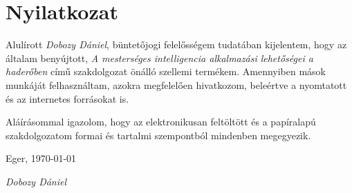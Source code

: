 \documentclass{thesis-ekf}
\begin{document}
\chapter*{Nyilatkozat}
\thispagestyle{empty}

Alulírott \emph{Dobozy Dániel}, büntetőjogi felelősségem tudatában kijelentem, hogy az általam benyújtott, \emph{A mesterséges intelligencia alkalmazási lehetőségei a haderőben} című szakdolgozat önálló szellemi termékem. Amennyiben mások munkáját felhasználtam, azokra megfelelően hivatkozom, beleértve a nyomtatott és az internetes forrásokat is.

Aláírásommal igazolom, hogy az elektronikusan feltöltött és a papíralapú szakdolgozatom formai és tartalmi szempontból mindenben megegyezik.

\bigskip
\begin{flushleft}
Eger, \today
\end{flushleft}

\bigskip
\begin{flushright}
\emph{Dobozy Dániel}\hspace{3cm}\mbox{}
\end{flushright}

\end{document}
